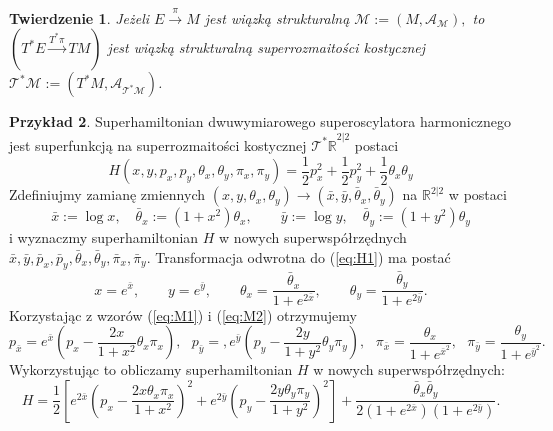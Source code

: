 \documentclass[11pt,a4paper]{report}
\newtheorem{theorem}{Twierdzenie}[section]
\theoremstyle{definition}
\newtheorem{example}[theorem]{Przykład}
\begin{document}
\begin{theorem}
	Jeżeli $E\stackrel{\pi}{\rightarrow} M$ jest wiązką strukturalną $\mathcal{M} := (M, \mathcal{A_M}),$ to $(T^*E\stackrel{T^*\pi}{\rightarrow} TM)$ jest wiązką strukturalną superrozmaitości kostycznej $\mathcal{T^*M} := (T^*M, \mathcal{A_{T^*M}})$.
\end{theorem}
		      			
\begin{example} 
	Superhamiltonian dwuwymiarowego superoscylatora harmonicznego jest superfunkcją na superrozmaitości kostycznej $\mathcal{T^*\mathbb{R}}^{2|2}$ postaci
	\begin{equation*}
		H(x,y,p_x, p_y, \theta_x, \theta_y, \pi_x, \pi_y) = \frac12 p_x^2 + \frac12 p_y^2 + \frac12 \theta_x \theta_y
	\end{equation*}
	Zdefiniujmy zamianę zmiennych $(x, y, \theta_x, \theta_y) \rightarrow (\bar x, \bar y, \bar \theta_x, \bar \theta_y)$ na $\mathbb{R}^{2|2}$ w postaci
	\begin{equation}
		\label{eq:H1}
		\bar x:=\log x,\quad \bar \theta_x:=(1+x^2)\theta_x,\qquad \bar y:=\log y,\quad\bar \theta_y:=(1+y^2)\theta_y 
	\end{equation}
	i wyznaczmy superhamiltonian $H$ w nowych superwspółrzędnych $\bar x, \bar y, \bar p_x, \bar p_y, \bar \theta_x, \bar \theta_y, \bar \pi_x, \bar \pi_y$. Transformacja odwrotna do (\ref{eq:H1}) ma postać
	\begin{equation*}
		x=e^{\bar x},\qquad y=e^{\bar y},\qquad \theta_x=\frac{\bar\theta_x }{1+e^{2\bar x}},\qquad \theta_y=\frac{\bar\theta_y }{1+e^{2\bar y}}.
	\end{equation*}
	Korzystając z wzorów (\ref{eq:M1}) i (\ref{eq:M2}) otrzymujemy
	\begin{equation*}
		p_{\bar x}=e^{\bar x}\left(p_x-\frac{2x}{1+x^2}\theta_x\pi_x\right),\,\,\,\,
		p_{\bar y}=,e^{\bar y}\left(p_y-\frac{2y}{1+y^2}\theta_y\pi_y\right),\,\,\,\,\pi_{\bar x}=\frac{\theta_x}{1+e^{\bar x^2}},\,\,\,\,\pi_{\bar y}=\frac{\theta_y}{1+e^{\bar y^2}}.
	\end{equation*}
	Wykorzystując to obliczamy superhamiltonian $H$ w nowych superwspółrzędnych:
	\begin{equation*}
		H = \frac12\left[e^{2\bar x}\left(p_x-\frac{2x\theta_x\pi_x}{1+x^2}\right)^2+e^{2\bar y}\left(p_y-\frac{2y\theta_y\pi_y}{1+y^2}\right)^2\right]+\frac{\bar \theta_x\bar \theta_y}{2(1+e^{2\bar x})(1+e^{2\bar y})}.
	\end{equation*}
\end{example}
		      			
\end{document}
